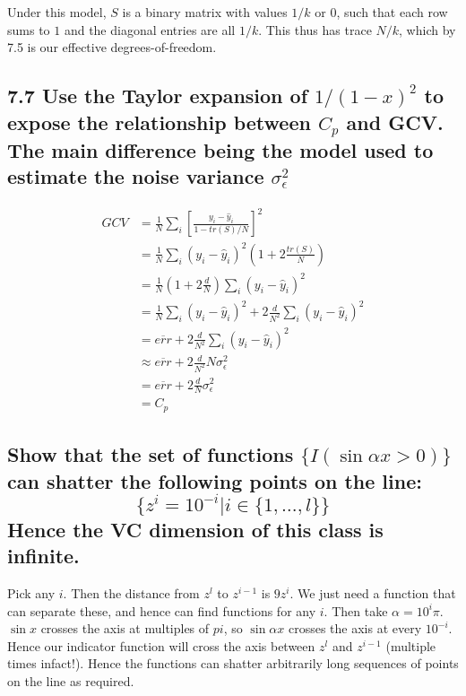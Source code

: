 Under this model, $S$ is a binary matrix with values $1/k$ or 0, such that each row sums to $1$ and the diagonal entries are all $1/k$. This thus has trace $N/k$, which by 7.5 is our effective degrees-of-freedom.

\subsection*{7.7 Use the Taylor expansion of $1/(1-x)^2$ to expose the relationship between $C_p$ and GCV. The main difference being the model used to estimate the noise variance $\sigma_\epsilon^2$}

\begin{align*}
    GCV &= \frac{1}{N} \sum_i \left[ \frac{y_i - \hat{y}_i}{1 - tr(S) / N}\right]^2 \\
    &= \frac{1}{N} \sum_i \left( y_i - \hat{y}_i\right)^2 \left( 1 + 2 \frac{tr(S)}{N} \right)\\
    &= \frac{1}{N} \left( 1 + 2 \frac{d}{N} \right) \sum_i \left( y_i - \hat{y}_i\right)^2 \\
    &= \frac{1}{N}\sum_i \left( y_i - \hat{y}_i\right)^2  + 2 \frac{d}{N^2}  \sum_i \left( y_i - \hat{y}_i\right)^2 \\
    &= \overline{err}  + 2 \frac{d}{N^2}  \sum_i \left( y_i - \hat{y}_i\right)^2\\
    &\approx \overline{err}  + 2 \frac{d}{N^2}  N \sigma_\epsilon^2\\
    &= \overline{err}  + 2 \frac{d}{N} \sigma_\epsilon^2 \\
    &= C_p
\end{align*}

\subsection*{Show that the set of functions $\{I(\sin{\alpha x} > 0)\}$ can shatter the following points on the line:
$$\{z^i = 10^{-i} \vert i \in \{1, \dots, l\} \}$$
Hence the VC dimension of this class is infinite.}

Pick any $i$. Then the distance from $z^l$ to $z^{i-1}$ is $9 z^i$. We just need a function that can separate these, and hence can find functions for any $i$. Then take $\alpha = 10^i \pi$. $\sin{x}$ crosses the axis at multiples of $pi$, so $\sin{\alpha x}$ crosses the axis at every $10^{-i}$. Hence our indicator function will cross the axis between  $z^l$ and $z^{i-1}$ (multiple times infact!).
Hence the functions can shatter arbitrarily long sequences of points on the line as required.